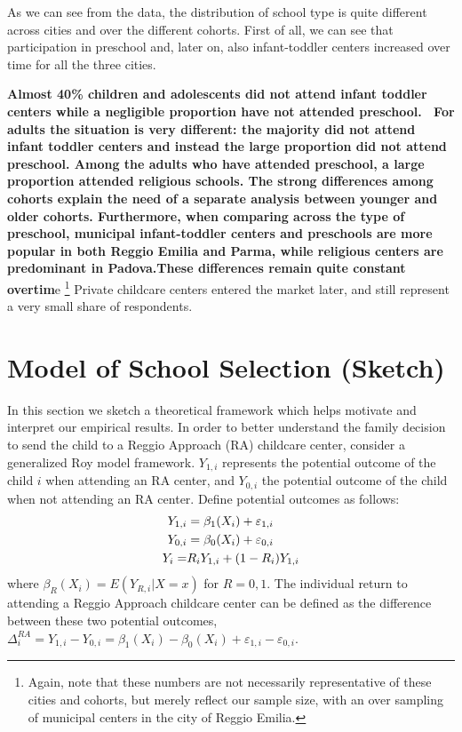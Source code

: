 \documentclass[12pt]{article}
\begin{document}
As we can see from the data, the distribution of school type is quite
different across cities and over the different cohorts. First of all, we can
see that participation in preschool and, later on, also infant-toddler
centers increased over time for all the three cities.

\textbf{Almost 40\% children and adolescents did not attend infant toddler
centers while a negligible proportion have not attended preschool. \ For
adults the situation is very different: the majority did not attend infant
toddler centers and instead the large proportion did not attend preschool.
Among the adults who have attended preschool, a large proportion attended
religious schools. The strong differences among cohorts explain the need of
a separate analysis between younger and older cohorts. Furthermore, when
comparing across the type of preschool, municipal infant-toddler centers and
preschools are more popular in both Reggio Emilia and Parma, while religious
centers are predominant in Padova.These differences remain quite constant
overtim}e \footnote{%
Again, note that these numbers are not necessarily representative of these
cities and cohorts, but merely reflect our sample size, with an over
sampling of municipal centers in the city of Reggio Emilia.} Private
childcare centers entered the market later, and still represent a very small
share of respondents.


\section{Model of School Selection (Sketch)}

\label{sec:model}

In this section we sketch a theoretical framework which helps motivate and
interpret our empirical results. In order to better understand the family
decision to send the child to a Reggio Approach (RA) childcare center,
consider a generalized Roy model framework. $Y_{1,i}$ represents the
potential outcome of the child $i$ when attending an RA center, and $Y_{0,i}$
the potential outcome of the child when not attending an RA center. Define
potential outcomes as follows: 
\begin{align}
Y_{1,i}& =\beta_{1}(X_{i})+\varepsilon_{1,i}  \notag \\
Y_{0,i}& =\beta_{0}(X_{i})+\varepsilon_{0,i}  \notag \\
Y_{i} =& R_{i}Y_{1,i} + (1-R_{i}) Y_{1,i}  \label{eq:outcome}
\end{align}%
where $\beta_{R}(X_{i})=E(Y_{R,i}|X=x)$ for $R=0,1$. The individual return
to attending a Reggio Approach childcare center can be defined as the
difference between these two potential outcomes, $%
\Delta_{i}^{RA}=Y_{1,i}-Y_{0,i}=\beta_{1}(X_{i})-\beta_{0}(X_{i})+%
\varepsilon_{1,i}-\varepsilon_{0,i}$.
\end{document}
